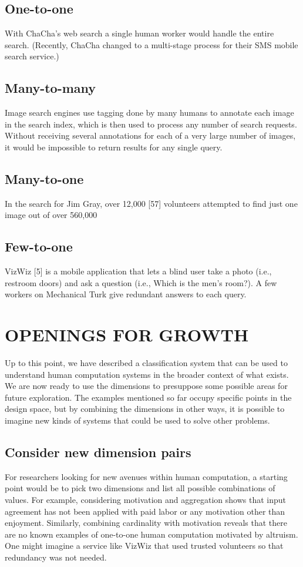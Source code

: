 \documentclass{sig-alternate}
\begin{document}
\subsection*{One-to-one}
With ChaCha’s web search a single human worker would handle the entire search. (Recently, ChaCha changed to a multi-stage process for their SMS mobile search service.)
\subsection*{Many-to-many}
Image search engines use tagging done by many humans to annotate each image in the search index, which is then used to process any number of search requests. Without receiving several annotations for each of a very large number of images, it would be impossible to return results for any single query.
\subsection*{Many-to-one}
In the search for Jim Gray, over 12,000 [57] volunteers attempted to find just one image out of over 560,000
\subsection*{Few-to-one}
VizWiz [5] is a mobile application that lets a blind user take a photo (i.e., restroom doors) and ask a question (i.e., Which is the men’s room?). A few workers on Mechanical Turk give redundant answers to each query.
\section*{OPENINGS FOR GROWTH}
Up to this point, we have described a classification system that can be used to understand human computation systems in the broader context of what exists. We are now ready to use the dimensions to presuppose some possible areas for future exploration. The examples mentioned so far occupy specific points in the design space, but by combining the dimensions in other ways, it is possible to imagine new kinds of systems that could be used to solve other problems.
\subsection*{Consider new dimension pairs}
For researchers looking for new avenues within human computation, a starting point would be to pick two dimensions and list all possible combinations of values. For example, considering motivation and aggregation shows that input agreement has not been applied with paid labor or any motivation other than enjoyment. Similarly, combining cardinality with motivation reveals that there are no known examples of one-to-one human computation motivated by altruism. One might imagine a service like VizWiz that used trusted volunteers so that redundancy was not needed.
\end{document}
